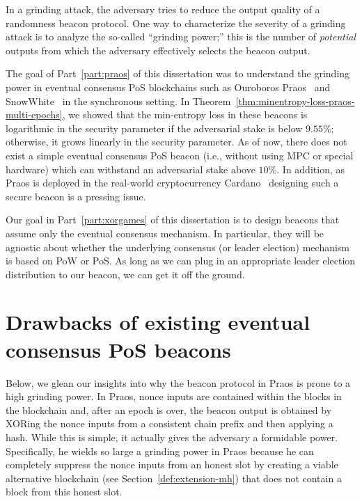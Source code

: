 
In a grinding attack, 
the adversary tries to reduce the output quality 
of a randomness beacon protocol.
One way to characterize the severity of a grinding attack 
is to analyze the so-called ``grinding power;'' 
this is the number of \emph{potential} outputs 
from which the adversary effectively selects the beacon output.

The goal of Part~\ref{part:praos} of this dissertation was to understand the grinding power in 
eventual consensus PoS blockchains such as 
Ouroboros Praos~\cite{Praos} and SnowWhite~\cite{SnowWhite} 
in the synchronous setting. 
In Theorem~\ref{thm:minentropy-loss-praos-multi-epochs}, 
we showed that the min-entropy loss in these beacons  
is logarithmic in the security parameter if the adversarial stake is below $9.55\%$; 
otherwise, it grows linearly in the security parameter. 
As of now, there does not exist a simple eventual consensus PoS beacon (i.e., without using MPC or special hardware) 
which can withstand an adversarial stake above $10\%$. 
In addition, as Praos is deployed in the real-world cryptocurrency Cardano~\cite{Cardano,CardanoPraos} 
designing such a secure beacon is a pressing issue.

Our goal in Part~\ref{part:xorgames} of this dissertation is 
to design beacons that assume 
only the eventual consensus mechanism. 
In particular, they will be agnostic about whether the underlying consensus (or leader election) mechanism is based on PoW or PoS. 
As long as we can plug in an appropriate leader election distribution to our beacon, 
we can get it off the ground.







\section{Drawbacks of existing eventual consensus PoS beacons}  
    Below, we glean our insights into why the beacon protocol in Praos 
    is prone to a high grinding power. 
    In Praos, 
    nonce inputs are contained within the blocks in the blockchain 
    and, after an epoch is over, 
    the beacon output is obtained by XORing the nonce inputs from a consistent chain prefix 
    and then applying a hash.
    While this is simple, 
    it actually gives the adversary a formidable power. 
    Specifically, he wields so large a grinding power in Praos 
    because 
    he can completely suppress the nonce inputs from an honest slot 
    by creating a viable alternative blockchain (see Section~\ref{def:extension-mh}) 
    that does not contain a block from this honest slot. 

